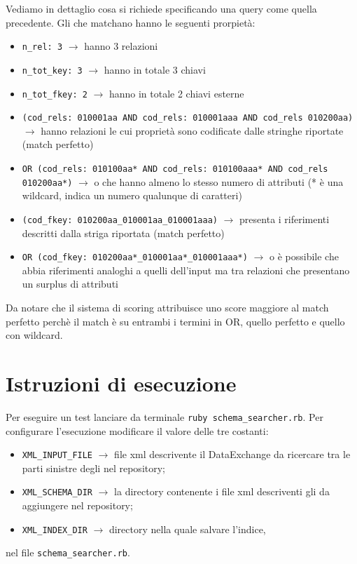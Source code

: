 Vediamo in dettaglio cosa si richiede specificando una query come quella precedente. Gli \se che matchano hanno le seguenti prorpietà: 
\begin{itemize}
	\item {\tt n\_rel: 3} $\rightarrow$ hanno 3 relazioni
	\item {\tt n\_tot\_key: 3} $\rightarrow$ hanno in totale 3 chiavi
	\item {\tt n\_tot\_fkey: 2} $\rightarrow$ hanno in totale 2 chiavi esterne
	\item {\tt (cod\_rels: 010001aa AND cod\_rels: 010001aaa AND cod\_rels 010200aa)} $\rightarrow$ hanno relazioni le cui proprietà sono codificate dalle stringhe riportate (match perfetto)
	\item {\tt OR (cod\_rels: 010100aa* AND cod\_rels: 010100aaa* AND cod\_rels 010200aa*)} $\rightarrow$ o che hanno almeno lo stesso numero di attributi (* è una wildcard, indica un numero qualunque di caratteri)
	\item {\tt (cod\_fkey: 010200aa\_010001aa\_010001aaa)} $\rightarrow$ presenta i riferimenti descritti dalla striga riportata (match perfetto)
	\item {\tt OR (cod\_fkey: 010200aa*\_010001aa*\_010001aaa*)} $\rightarrow$ o è possibile che abbia riferimenti analoghi a quelli dell'input ma tra relazioni che presentano un surplus di attributi
\end{itemize}
Da notare che il sistema di scoring attribuisce uno score maggiore al match perfetto perchè il match è su entrambi i termini in OR, quello perfetto e quello con wildcard.

\section*{Istruzioni di esecuzione}
\noindent Per eseguire un test lanciare da terminale {\tt ruby schema\_searcher.rb}. Per configurare l'esecuzione modificare il valore delle tre costanti:
\begin{itemize}
	\item {\tt XML\_INPUT\_FILE} $\rightarrow$ file xml descrivente il DataExchange da ricercare tra le parti sinistre degli \se nel repository;
	\item {\tt XML\_SCHEMA\_DIR} $\rightarrow$ la directory contenente i file xml descriventi gli \se da aggiungere nel repository;
	\item {\tt XML\_INDEX\_DIR} $\rightarrow$ directory nella quale salvare l'indice,
\end{itemize}
nel file {\tt schema\_searcher.rb}.

